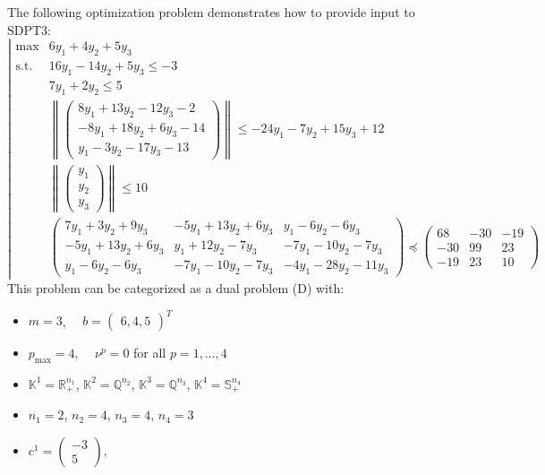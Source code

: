 \begin{example}
The following optimization problem demonstrates how to provide input to SDPT3:
\[
\left|
\begin{array}{cl}
\max  & 6y_1 + 4y_2 + 5y_3 \\
\mathrm{s.t.} 
& 16y_1 - 14y_2 + 5y_3 \leq -3 \\
& 7y_1 + 2y_2 \leq 5 \\
& \left\| \begin{pmatrix} 8y_1 + 13y_2 - 12y_3 - 2 \\ -8y_1 + 18y_2 + 6y_3 - 14 \\ y_1 - 3y_2 - 17y_3 - 13 \end{pmatrix} \right\|  \leq -24y_1 - 7y_2 + 15y_3 + 12 \\
& \left\| \begin{pmatrix} y_1 \\ y_2 \\ y_3 \end{pmatrix} \right\|  \leq 10 \\
& \begin{pmatrix} 
7y_1 + 3y_2 + 9y_3 & -5y_1 + 13y_2 + 6y_3 & y_1 - 6y_2 - 6y_3 \\
-5y_1 + 13y_2 + 6y_3 & y_1 + 12y_2 - 7y_3 & -7y_1 - 10y_2 - 7y_3 \\
y_1 - 6y_2 - 6y_3 & -7y_1 - 10y_2 - 7y_3 & -4y_1 - 28y_2 - 11y_3
\end{pmatrix}  \preceq \begin{pmatrix} 68 & -30 & -19 \\ -30 & 99 & 23 \\ -19 & 23 & 10 \end{pmatrix}
\end{array}
\right.
\]
This problem can be categorized as a dual problem (D) with:
\begin{itemize}
    \item $m = 3$, 
    $\quad b = \begin{pmatrix} 6,  4,  5 \end{pmatrix}^T$
    \item $p_{\max} = 4$, 
    $\quad \nu^p = 0$ for all $p=1,\ldots,4$
    \item $\mathbb{K}^1 = \mathbb{R}^{n_1}_+$, 
    $\mathbb{K}^2 = \mathbb{Q}^{n_2}$, 
    $\mathbb{K}^3 = \mathbb{Q}^{n_3}$, 
    $\mathbb{K}^4 = \mathbb{S}^{n_4}_+$
    \item $n_1 = 2$, 
    $n_2 = 4$, 
    $n_3 = 4$, 
    $n_4 = 3$
    \item $c^1 = \begin{pmatrix} -3 \\ 5 \end{pmatrix}$, 

\end{itemize}
\end{example}
